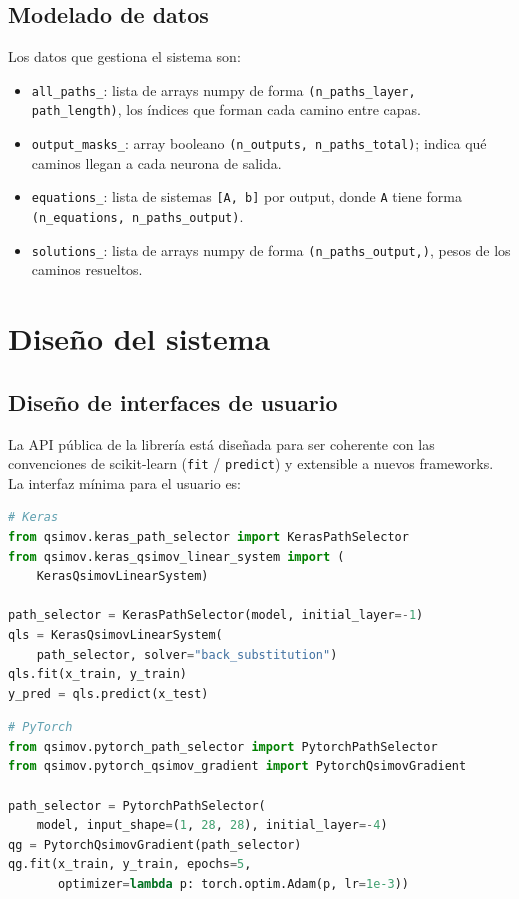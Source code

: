 \subsection{Modelado de datos}

Los datos que gestiona el sistema son:
\begin{itemize}
  \item \texttt{all\_paths\_}: lista de arrays numpy de forma \texttt{(n\_paths\_layer, path\_length)},
        los índices que forman cada camino entre capas.
  \item \texttt{output\_masks\_}: array booleano
        \texttt{(n\_outputs, n\_paths\_total)};
        indica qué caminos llegan a cada neurona de salida.
  \item \texttt{equations\_}: lista de sistemas \texttt{[A, b]} por output, donde \texttt{A} tiene
        forma \texttt{(n\_equations, n\_paths\_output)}.
  \item \texttt{solutions\_}: lista de arrays numpy de forma \texttt{(n\_paths\_output,)},
        pesos de los caminos resueltos.
\end{itemize}

\section{Diseño del sistema}

\subsection{Diseño de interfaces de usuario}

La API pública de la librería está diseñada para ser coherente con las convenciones de scikit-learn
(\texttt{fit} / \texttt{predict}) y extensible a nuevos frameworks. La interfaz mínima para el
usuario es:

\begin{lstlisting}[language=Python, caption={API mínima -- variante Keras.}]
# Keras
from qsimov.keras_path_selector import KerasPathSelector
from qsimov.keras_qsimov_linear_system import (
    KerasQsimovLinearSystem)

path_selector = KerasPathSelector(model, initial_layer=-1)
qls = KerasQsimovLinearSystem(
    path_selector, solver="back_substitution")
qls.fit(x_train, y_train)
y_pred = qls.predict(x_test)
\end{lstlisting}

\begin{lstlisting}[language=Python, caption={API mínima -- variante PyTorch.}]
# PyTorch
from qsimov.pytorch_path_selector import PytorchPathSelector
from qsimov.pytorch_qsimov_gradient import PytorchQsimovGradient

path_selector = PytorchPathSelector(
    model, input_shape=(1, 28, 28), initial_layer=-4)
qg = PytorchQsimovGradient(path_selector)
qg.fit(x_train, y_train, epochs=5,
       optimizer=lambda p: torch.optim.Adam(p, lr=1e-3))
\end{lstlisting}

